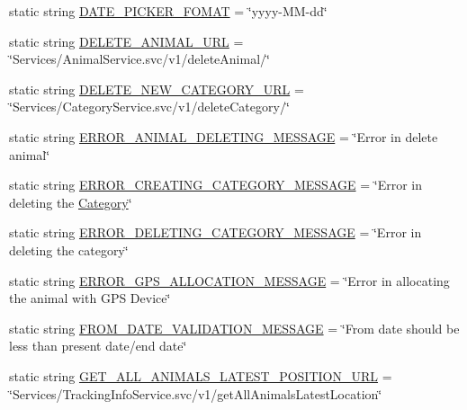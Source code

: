 \begin{DoxyCompactItemize}
\item 
static string \hyperlink{classWildlifeTrackingApp_1_1Utility_1_1Constants_ad30b3b723d160b203f8ee9a4d2894368}{D\+A\+T\+E\+\_\+\+P\+I\+C\+K\+E\+R\+\_\+\+F\+O\+M\+AT} = \char`\"{}yyyy-\/MM-\/dd\char`\"{}
\item 
static string \hyperlink{classWildlifeTrackingApp_1_1Utility_1_1Constants_a79f17386a483eb46ced47455c8b2114e}{D\+E\+L\+E\+T\+E\+\_\+\+A\+N\+I\+M\+A\+L\+\_\+\+U\+RL} = \char`\"{}Services/Animal\+Service.\+svc/v1/delete\+Animal/\char`\"{}
\item 
static string \hyperlink{classWildlifeTrackingApp_1_1Utility_1_1Constants_a5bada733b70103a3673dca0d63bc0f79}{D\+E\+L\+E\+T\+E\+\_\+\+N\+E\+W\+\_\+\+C\+A\+T\+E\+G\+O\+R\+Y\+\_\+\+U\+RL} = \char`\"{}Services/Category\+Service.\+svc/v1/delete\+Category/\char`\"{}
\item 
static string \hyperlink{classWildlifeTrackingApp_1_1Utility_1_1Constants_afc4cd87d4d5553a12fc5a7b7e7b9a081}{E\+R\+R\+O\+R\+\_\+\+A\+N\+I\+M\+A\+L\+\_\+\+D\+E\+L\+E\+T\+I\+N\+G\+\_\+\+M\+E\+S\+S\+A\+GE} = \char`\"{}Error in delete animal\char`\"{}
\item 
static string \hyperlink{classWildlifeTrackingApp_1_1Utility_1_1Constants_a23507886683a294679c1916b50b7b2eb}{E\+R\+R\+O\+R\+\_\+\+C\+R\+E\+A\+T\+I\+N\+G\+\_\+\+C\+A\+T\+E\+G\+O\+R\+Y\+\_\+\+M\+E\+S\+S\+A\+GE} = \char`\"{}Error in deleting the \hyperlink{classWildlifeTrackingApp_1_1Category}{Category}\char`\"{}
\item 
static string \hyperlink{classWildlifeTrackingApp_1_1Utility_1_1Constants_a3677f3f16659ea015b9737c0b366dbe3}{E\+R\+R\+O\+R\+\_\+\+D\+E\+L\+E\+T\+I\+N\+G\+\_\+\+C\+A\+T\+E\+G\+O\+R\+Y\+\_\+\+M\+E\+S\+S\+A\+GE} = \char`\"{}Error in deleting the category\char`\"{}
\item 
static string \hyperlink{classWildlifeTrackingApp_1_1Utility_1_1Constants_a207801de28af5d299304a40cfb45a273}{E\+R\+R\+O\+R\+\_\+\+G\+P\+S\+\_\+\+A\+L\+L\+O\+C\+A\+T\+I\+O\+N\+\_\+\+M\+E\+S\+S\+A\+GE} = \char`\"{}Error in allocating the animal with G\+PS Device\char`\"{}
\item 
static string \hyperlink{classWildlifeTrackingApp_1_1Utility_1_1Constants_a688156a62d9b70ee7ddf29c359e50c4f}{F\+R\+O\+M\+\_\+\+D\+A\+T\+E\+\_\+\+V\+A\+L\+I\+D\+A\+T\+I\+O\+N\+\_\+\+M\+E\+S\+S\+A\+GE} = \char`\"{}From date should be less than present date/end date\char`\"{}
\item 
static string \hyperlink{classWildlifeTrackingApp_1_1Utility_1_1Constants_a5b11de05186392a645b8b03e863a0f0e}{G\+E\+T\+\_\+\+A\+L\+L\+\_\+\+A\+N\+I\+M\+A\+L\+S\+\_\+\+L\+A\+T\+E\+S\+T\+\_\+\+P\+O\+S\+I\+T\+I\+O\+N\+\_\+\+U\+RL} = \char`\"{}Services/Tracking\+Info\+Service.\+svc/v1/get\+All\+Animals\+Latest\+Location\char`\"{}

\end{DoxyCompactItemize}
